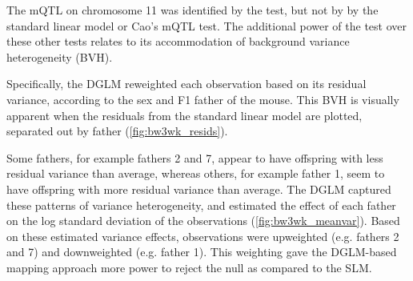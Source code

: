     The mQTL on chromosome 11 was identified by the \DGLMm test, but not by by the standard linear model or Cao's mQTL test.
    The additional power of the \DGLMm test over these other tests relates to its accommodation of background variance heterogeneity (BVH).
    
    Specifically, the DGLM reweighted each observation based on its residual variance, according to the sex and F1 father of the mouse.
    This BVH is visually apparent when the residuals from the standard linear model are plotted, separated out by father (\autoref{fig:bw3wk_resids}).


    Some fathers, for example fathers 2 and 7, appear to have offspring with less residual variance than average, whereas others, for example father 1, seem to have offspring with more residual variance than average.
    The DGLM captured these patterns of variance heterogeneity, and estimated the effect of each father on the log standard deviation of the observations (\autoref{fig:bw3wk_meanvar}).
    Based on these estimated variance effects, observations were upweighted (e.g. fathers 2 and 7) and downweighted (e.g. father 1).
    This weighting gave the DGLM-based mapping approach more power to reject the null as compared to the SLM.


